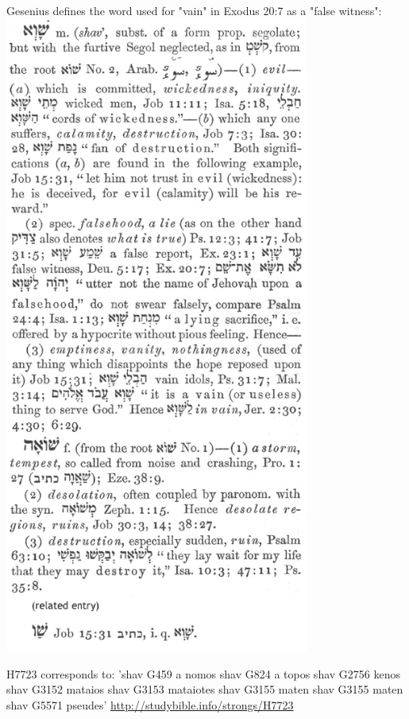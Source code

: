 \documentclass[11pt]{article}
\begin{document}
\begin{thebibliography}{37}
Gesenius defines the word used for "vain" in Exodus 20:7 as a "false witness":
\includegraphics[width=10cm]{vain_hebrew}

H7723 corresponds to:\newline
'shav G459 a nomos\newline
shav G824 a topos\newline
shav G2756 kenos\newline
shav G3152 mataios\newline
shav G3153 mataiotes\newline
shav G3155 maten\newline
shav G3155 maten\newline
shav G5571 pseudes'\newline
\url{http://studybible.info/strongs/H7723}\newline



\end{thebibliography}
\end{document}

